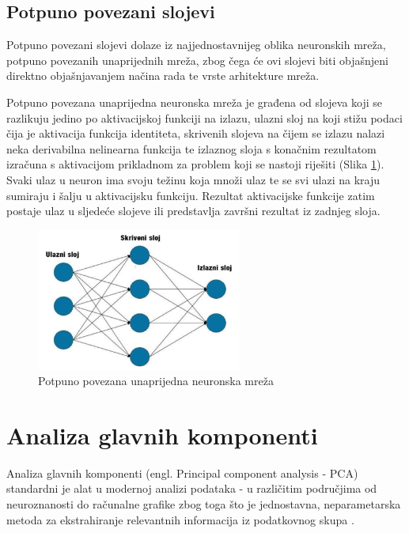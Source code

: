 \documentclass[times, utf8, proizvoljni, numeric]{fer}
\begin{document}
\subsection{Potpuno povezani slojevi}

Potpuno povezani slojevi dolaze iz najjednostavnijeg oblika neuronskih mreža, potpuno povezanih unaprijednih mreža, zbog čega će ovi slojevi biti objašnjeni direktno objašnjavanjem načina rada te vrste arhitekture mreža.
 
Potpuno povezana unaprijedna neuronska mreža je građena od slojeva koji se razlikuju jedino po aktivacijskoj funkciji na izlazu, ulazni sloj na koji stižu podaci čija je aktivacija funkcija identiteta, skrivenih slojeva na čijem se izlazu nalazi neka derivabilna nelinearna funkcija te izlaznog sloja s konačnim rezultatom izračuna s aktivacijom prikladnom za problem koji se nastoji riješiti (Slika \ref{fg:potpuno_povezana}). Svaki ulaz u neuron ima svoju težinu koja množi ulaz te se svi ulazi na kraju sumiraju i šalju u aktivacijsku funkciju. Rezultat aktivacijske funkcije zatim postaje ulaz u sljedeće slojeve ili predstavlja završni rezultat iz zadnjeg sloja.

\begin{figure}[!ht]
	\begin{center}
		\captionsetup{justification=centering}
		\includegraphics[width=0.6\textwidth]{./imgs/potpuno_povezana.png}
		\caption{Potpuno povezana unaprijedna neuronska mreža}
		\label{fg:potpuno_povezana}
	\end{center}
\end{figure}

\section{Analiza glavnih komponenti}

Analiza glavnih komponenti (engl. Principal component analysis - PCA) standardni je alat u modernoj analizi podataka - u različitim područjima od neuroznanosti do računalne grafike zbog toga što je jednostavna, neparametarska metoda za ekstrahiranje relevantnih informacija iz podatkovnog skupa \cite{PCA}.
\end{document}
